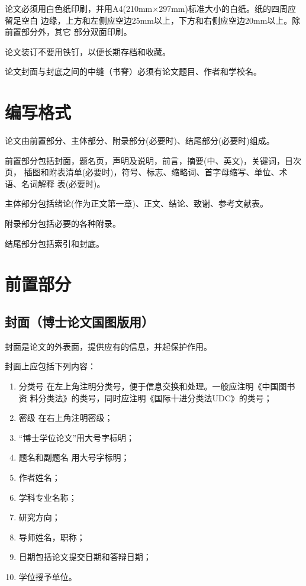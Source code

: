 \documentclass[master]{njuthesis}
\begin{document}
论文必须用白色纸印刷，并用A4(210mm×297mm)标准大小的白纸。纸的四周应留足空白
边缘，上方和左侧应空边25mm以上，下方和右侧应空边20mm以上。除前置部分外，其它
部分双面印刷。

论文装订不要用铁钉，以便长期存档和收藏。

论文封面与封底之间的中缝（书脊）必须有论文题目、作者和学校名。

\section{编写格式}

论文由前置部分、主体部分、附录部分(必要时)、结尾部分(必要时)组成。

前置部分包括封面，题名页，声明及说明，前言，摘要(中、英文)，关键词，目次页，
插图和附表清单(必要时)，符号、标志、缩略词、首字母缩写、单位、术语、名词解释
表(必要时)。

主体部分包括绪论(作为正文第一章)、正文、结论、致谢、参考文献表。

附录部分包括必要的各种附录。

结尾部分包括索引和封底。

\section{前置部分}

\subsection{封面（博士论文国图版用）}

封面是论文的外表面，提供应有的信息，并起保护作用。

封面上应包括下列内容：
\begin{enumerate}
\item 分类号  在左上角注明分类号，便于信息交换和处理。一般应注明《中国图书资
  料分类法》的类号，同时应注明《国际十进分类法UDC》的类号；
\item 密级  在右上角注明密级；
\item “博士学位论文”用大号字标明；
\item 题名和副题名   用大号字标明；
\item 作者姓名；
\item 学科专业名称；
\item 研究方向；
\item 导师姓名，职称；
\item 日期包括论文提交日期和答辩日期；
\item 学位授予单位。
\end{enumerate}
\end{document}
